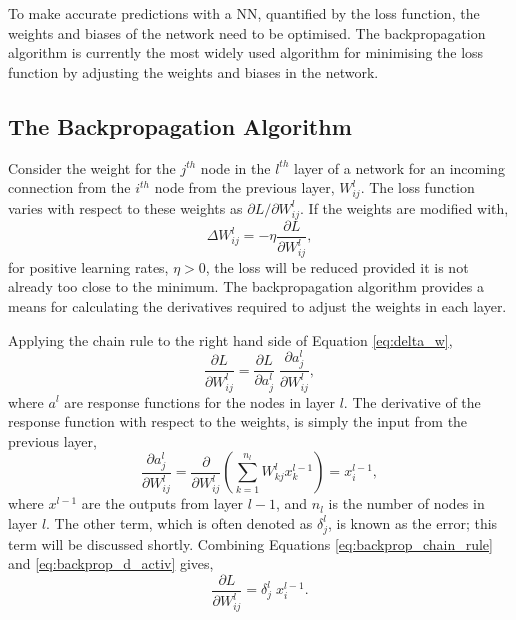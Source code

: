 \noindent
To make accurate predictions with a NN, quantified by the loss function, the
weights and biases of the network need to be optimised. The backpropagation
algorithm\cite{Rumelhart1986} is currently the most widely used algorithm for
minimising the loss function by adjusting the weights and biases in the network.

\subsection{The Backpropagation Algorithm}

Consider the weight for the $j^{th}$ node in the $l^{th}$ layer of a network for
an incoming connection from the $i^{th}$ node from the previous layer, 
$W^l_{ij}$. The loss function varies with respect to these weights as 
$\partial L/\partial W^l_{ ij }$. If the weights are modified with, 
\begin{equation} 
	\Delta W^l_{ ij } = -\eta \frac{\partial L}{\partial W^l_{ ij }},
	\label{eq:delta_w}
\end{equation}
for positive learning rates, $\eta > 0$, the loss will be reduced provided it
is not already too close to the minimum. The backpropagation algorithm provides 
a means for calculating the derivatives required to adjust the weights in each 
layer.

Applying the chain rule to the right hand side of Equation \ref{eq:delta_w},
\begin{equation}
	\frac{\partial L}{\partial W^l_{ij}} = \frac{\partial L}{\partial a^l_j} \;
	\frac{\partial a^l_j}{\partial W^l_{ij}},
	\label{eq:backprop_chain_rule}
\end{equation}
where $a^l$ are response functions for the nodes in layer $l$. The derivative 
of the response function with respect to the weights, is simply the input from 
the previous layer,
\begin{equation}
	\frac{\partial a^l_j}{\partial W^l_{ij}} = \frac{\partial}{\partial W^l_{ij}}
	\left( \sum_{k = 1}^{n_l} W^l_{kj} x^{l-1}_{k} \right) = x^{l-1}_i,
	\label{eq:backprop_d_activ}
\end{equation}
where $x^{l-1}$ are the outputs from layer $l-1$, and $n_l$ is the number of 
nodes in layer $l$. The other term, which is often denoted as $\delta^l_j$, is 
known as the error; this term will be discussed shortly. Combining Equations 
\ref{eq:backprop_chain_rule} and \ref{eq:backprop_d_activ} gives,
\begin{equation*}
	\frac{\partial L}{\partial W^l_{ij}} = \delta^l_j \; x^{l-1}_i.
\end{equation*}

